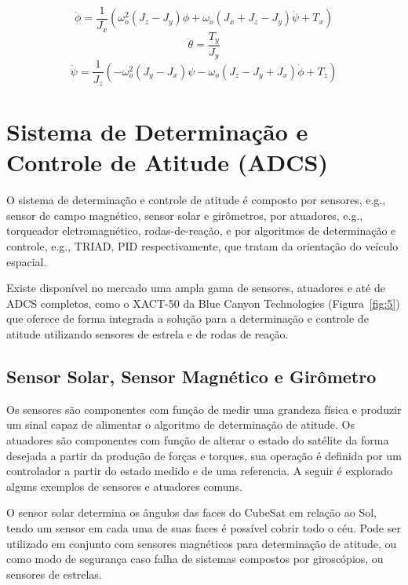 \begin{equation}
\ddot{\phi}=\frac{1}{J_x}(\omega_o^2(J_z-J_y)\phi+\omega_o(J_x+J_z-J_y)\dot{\psi}+T_x)
\end{equation}
\begin{equation}
\ddot{\theta}=\frac{T_y}{J_y}
\end{equation}
\begin{equation}
\ddot{\psi}=\frac{1}{J_z}(-\omega_o^2(J_y-J_x)\psi-\omega_o(J_z-J_y+J_x)\dot{\phi}+T_z)
\end{equation}



\section{Sistema de Determinação e Controle de Atitude (ADCS)}\label{sec:3.1.4}

O sistema de determinação e controle de atitude é composto por sensores, {e.g.}, sensor de campo magnético, sensor solar e girômetros, por atuadores, {e.g.}, torqueador eletromagnético, rodas-de-reação, e por algoritmos de determinação e controle, {e.g.}, TRIAD, PID respectivamente, que tratam da orientação do veículo espacial.

Existe disponível no mercado uma ampla gama de sensores, atuadores e até de ADCS completos, como o XACT-50 da Blue Canyon Technologies  (Figura~\ref{fig:5}) que oferece de forma integrada a solução para a determinação e controle de atitude utilizando sensores de estrela e de rodas de reação.

\subsection{Sensor Solar, Sensor Magnético e Girômetro}\label{sec:3.1.4.1}

Os sensores são componentes com  função de medir uma grandeza física e produzir um sinal capaz de alimentar o algoritmo de determinação de atitude. Os atuadores são componentes com função de alterar o estado do satélite da forma desejada a partir da produção de forças e torques, sua operação é definida por um controlador a partir do estado medido e de uma referencia. A seguir é explorado alguns exemplos de sensores e atuadores comuns.

O sensor solar determina os ângulos das faces do CubeSat em relação ao Sol, tendo um sensor em cada uma de suas faces é possível cobrir todo o céu. Pode ser utilizado em conjunto com sensores magnéticos para determinação de atitude, ou como modo de segurança caso falha de sistemas compostos por giroscópios, ou sensores de estrelas.

